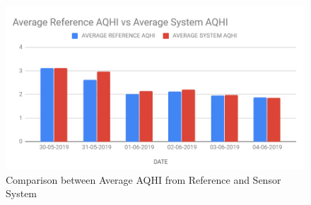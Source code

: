 \begin{figure}[h]
  \begin{center}
  \includegraphics[scale=0.70]{images/figure34.png}
  \end{center}
  \caption{Comparison between Average AQHI from Reference and Sensor System}
\label{AQHI}
\end{figure}
